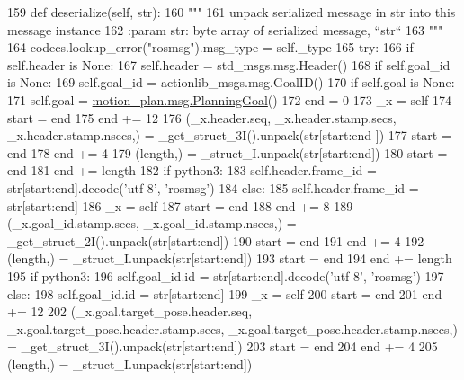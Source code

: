 \begin{DoxyCode}
159   \textcolor{keyword}{def }deserialize(self, str):
160     \textcolor{stringliteral}{"""}
161 \textcolor{stringliteral}{    unpack serialized message in str into this message instance}
162 \textcolor{stringliteral}{    :param str: byte array of serialized message, ``str``}
163 \textcolor{stringliteral}{    """}
164     codecs.lookup\_error(\textcolor{stringliteral}{"rosmsg"}).msg\_type = self.\_type
165     \textcolor{keywordflow}{try}:
166       \textcolor{keywordflow}{if} self.header \textcolor{keywordflow}{is} \textcolor{keywordtype}{None}:
167         self.header = std\_msgs.msg.Header()
168       \textcolor{keywordflow}{if} self.goal\_id \textcolor{keywordflow}{is} \textcolor{keywordtype}{None}:
169         self.goal\_id = actionlib\_msgs.msg.GoalID()
170       \textcolor{keywordflow}{if} self.goal \textcolor{keywordflow}{is} \textcolor{keywordtype}{None}:
171         self.goal = \hyperlink{classmotion__plan_1_1msg_1_1__PlanningGoal_1_1PlanningGoal}{motion\_plan.msg.PlanningGoal}()
172       end = 0
173       \_x = self
174       start = end
175       end += 12
176       (\_x.header.seq, \_x.header.stamp.secs, \_x.header.stamp.nsecs,) = \_get\_struct\_3I().unpack(str[start:end
      ])
177       start = end
178       end += 4
179       (length,) = \_struct\_I.unpack(str[start:end])
180       start = end
181       end += length
182       \textcolor{keywordflow}{if} python3:
183         self.header.frame\_id = str[start:end].decode(\textcolor{stringliteral}{'utf-8'}, \textcolor{stringliteral}{'rosmsg'})
184       \textcolor{keywordflow}{else}:
185         self.header.frame\_id = str[start:end]
186       \_x = self
187       start = end
188       end += 8
189       (\_x.goal\_id.stamp.secs, \_x.goal\_id.stamp.nsecs,) = \_get\_struct\_2I().unpack(str[start:end])
190       start = end
191       end += 4
192       (length,) = \_struct\_I.unpack(str[start:end])
193       start = end
194       end += length
195       \textcolor{keywordflow}{if} python3:
196         self.goal\_id.id = str[start:end].decode(\textcolor{stringliteral}{'utf-8'}, \textcolor{stringliteral}{'rosmsg'})
197       \textcolor{keywordflow}{else}:
198         self.goal\_id.id = str[start:end]
199       \_x = self
200       start = end
201       end += 12
202       (\_x.goal.target\_pose.header.seq, \_x.goal.target\_pose.header.stamp.secs, 
      \_x.goal.target\_pose.header.stamp.nsecs,) = \_get\_struct\_3I().unpack(str[start:end])
203       start = end
204       end += 4
205       (length,) = \_struct\_I.unpack(str[start:end])

\end{DoxyCode}
